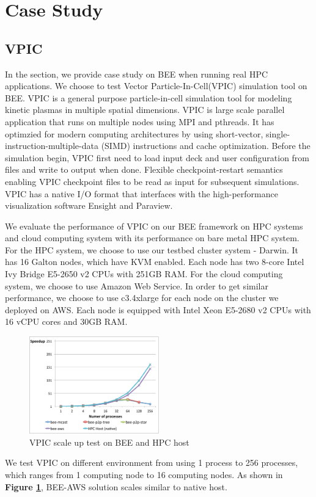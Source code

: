 \section{Case Study}
  \label{sec:case_study}
  \subsection{VPIC}
  In the section, we provide case study on BEE when running real HPC applications. We choose to test Vector Particle-In-Cell(VPIC) simulation tool \cite{bowers20080, bowers2008ultrahigh, bowers2009advances} on BEE. VPIC is a general purpose particle-in-cell simulation tool for modeling kinetic plasmas in multiple spatial dimensions. VPIC is large scale parallel application that runs on multiple nodes using MPI and pthreads. It has optimzied for modern computing architectures by using short-vector, single-instruction-multiple-data (SIMD) instructions and cache optimization. Before the simulation begin, VPIC first need to load input deck and user configuration from files and write to output when done. Flexible checkpoint-restart semantics enabling VPIC checkpoint files to be read as input for subsequent simulations. VPIC has a native I/O format that interfaces with the high-performance visualization software Ensight and Paraview. 

We evaluate the performance of VPIC on our BEE framework on HPC systems and cloud computing system with  its performance on bare metal HPC system. For the HPC system, we choose to use our testbed cluster system - Darwin. It has 16 Galton nodes, which have KVM enabled. Each node has two 8-core Intel Ivy Bridge E5-2650 v2 CPUs with 251GB RAM. For the cloud computing system, we choose to use Amazon Web Service. In order to get similar performance, we choose to use c3.4xlarge for each node on the cluster we deployed on AWS. Each node is equipped with Intel Xeon E5-2680 v2 CPUs with 16 vCPU cores and 30GB RAM. 


\begin{figure}[h]
    \centering
    \caption{VPIC scale up test on BEE and HPC host}
    \label{vpic-test}
    \includegraphics[width=0.5\textwidth]{figures/vpic-test.pdf}
\end{figure}

We test VPIC on different environment from using 1 process to 256 processes, which ranges from 1 computing node to 16 computing nodes. As shown in \textbf{Figure \ref{vpic-test}}, BEE-AWS solution scales similar to native host.  
